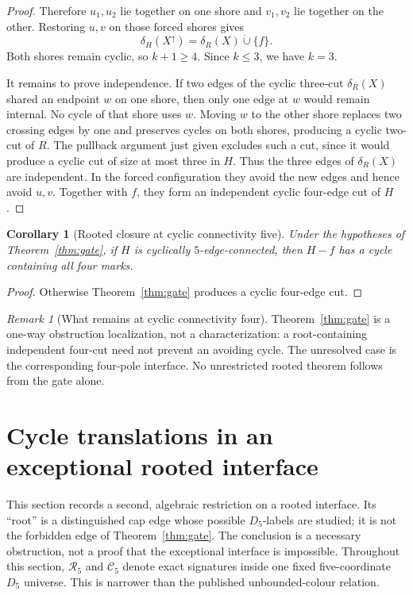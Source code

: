 \documentclass[11pt]{article}
\newtheorem{corollary}[theorem]{Corollary}
\theoremstyle{definition}
\theoremstyle{remark}
\newtheorem{remark}[theorem]{Remark}
\newcommand{\dotcupop}{\mathbin{\dot\cup}}
\begin{document}
\begin{proof}
Therefore \(u_1,u_2\) lie together on one shore and \(v_1,v_2\) lie
together on the other.  Restoring \(u,v\) on those forced shores gives
\[
 \delta_H(X^\uparrow)=\delta_R(X)\dotcupop\{f\}.
 \tag{5.3}\label{eq:pullback}
\]
Both shores remain cyclic, so \(k+1\geq4\).  Since \(k\leq3\), we have
\(k=3\).

It remains to prove independence.  If two edges of the cyclic
three-cut \(\delta_R(X)\) shared an endpoint \(w\) on one shore, then
only one edge at \(w\) would remain internal.  No cycle of that shore
uses \(w\).  Moving \(w\) to the other shore replaces two crossing
edges by one and preserves cycles on both shores, producing a cyclic
two-cut of \(R\).  The pullback argument just given excludes such a
cut, since it would produce a cyclic cut of size at most three in
\(H\).  Thus the three edges of \(\delta_R(X)\) are independent.  In
the forced configuration they avoid the new edges and hence avoid
\(u,v\).  Together with \(f\), they form an independent cyclic
four-edge cut of \(H\).
\end{proof}

\begin{corollary}[Rooted closure at cyclic connectivity five]
\label{cor:cyclic5}
Under the hypotheses of Theorem~\ref{thm:gate}, if \(H\) is cyclically
\(5\)-edge-connected, then \(H-f\) has a cycle containing all four
marks.
\end{corollary}

\begin{proof}
Otherwise Theorem~\ref{thm:gate} produces a cyclic four-edge cut.
\end{proof}

\begin{remark}[What remains at cyclic connectivity four]
Theorem~\ref{thm:gate} is a one-way obstruction localization, not a
characterization: a root-containing independent four-cut need not
prevent an avoiding cycle.  The unresolved case is the corresponding
four-pole interface.  No unrestricted rooted theorem follows from the
gate alone.
\end{remark}

\section{Cycle translations in an exceptional rooted interface}

This section records a second, algebraic restriction on a rooted
interface.  Its ``root'' is a distinguished cap edge whose possible
\(D_5\)-labels are studied; it is not the forbidden edge of
Theorem~\ref{thm:gate}.  The conclusion is a necessary obstruction, not
a proof that the exceptional interface is impossible.  Throughout this
section, \(\mathcal R_5\) and \(\mathcal C_5\) denote exact signatures
inside one fixed five-coordinate \(D_5\) universe.  This is narrower
than the published unbounded-colour relation.
\end{document}
